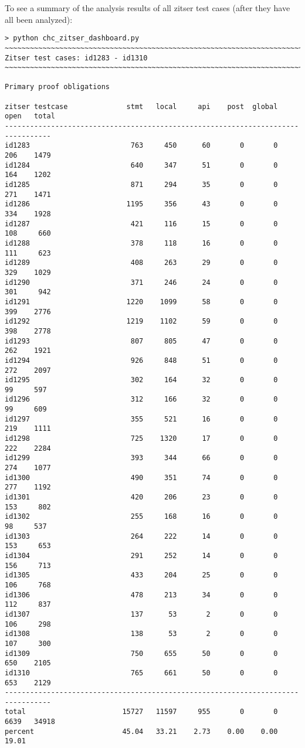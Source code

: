 \documentclass[11pt]{article}
\begin{document}
To see a summary of the analysis results of all zitser test cases (after they have
all been analyzed):
\begin{scriptsize}
\begin{verbatim}
> python chc_zitser_dashboard.py
~~~~~~~~~~~~~~~~~~~~~~~~~~~~~~~~~~~~~~~~~~~~~~~~~~~~~~~~~~~~~~~~~~~~~~~~~~~~~~~~
Zitser test cases: id1283 - id1310
~~~~~~~~~~~~~~~~~~~~~~~~~~~~~~~~~~~~~~~~~~~~~~~~~~~~~~~~~~~~~~~~~~~~~~~~~~~~~~~~

Primary proof obligations

zitser testcase              stmt   local     api    post  global    open   total
---------------------------------------------------------------------------------
id1283                        763     450      60       0       0     206    1479
id1284                        640     347      51       0       0     164    1202
id1285                        871     294      35       0       0     271    1471
id1286                       1195     356      43       0       0     334    1928
id1287                        421     116      15       0       0     108     660
id1288                        378     118      16       0       0     111     623
id1289                        408     263      29       0       0     329    1029
id1290                        371     246      24       0       0     301     942
id1291                       1220    1099      58       0       0     399    2776
id1292                       1219    1102      59       0       0     398    2778
id1293                        807     805      47       0       0     262    1921
id1294                        926     848      51       0       0     272    2097
id1295                        302     164      32       0       0      99     597
id1296                        312     166      32       0       0      99     609
id1297                        355     521      16       0       0     219    1111
id1298                        725    1320      17       0       0     222    2284
id1299                        393     344      66       0       0     274    1077
id1300                        490     351      74       0       0     277    1192
id1301                        420     206      23       0       0     153     802
id1302                        255     168      16       0       0      98     537
id1303                        264     222      14       0       0     153     653
id1304                        291     252      14       0       0     156     713
id1305                        433     204      25       0       0     106     768
id1306                        478     213      34       0       0     112     837
id1307                        137      53       2       0       0     106     298
id1308                        138      53       2       0       0     107     300
id1309                        750     655      50       0       0     650    2105
id1310                        765     661      50       0       0     653    2129
---------------------------------------------------------------------------------
total                       15727   11597     955       0       0    6639   34918
percent                     45.04   33.21    2.73    0.00    0.00   19.01


\end{verbatim}
\end{scriptsize}
\end{document}
